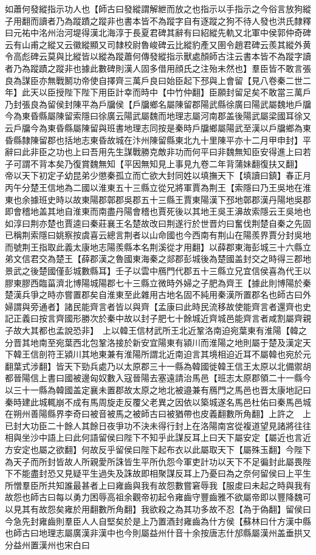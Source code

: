 如蕭何發縱指示功人也【師古曰發縱謂解紲而放之也指示以手指示之今俗言放狗縱子用翻而讀者乃為蹤蹟之蹤非也書本皆不為蹤字自有逐蹤之狗不待人發也洪氏隸釋曰元祐中洺州治河堤得漢北海淳于長夏君碑其辭有曰紹縱先軌又北軍中侯郭仲奇碑云有山甫之縱又云徽縱顯又司隸校尉魯峻碑云比縱豹產又圉令趙君碑云羨其縱外黄令高彪碑云莫與比縱皆以縱為蹤蕭何傳發縱指示獸處顏師古注云書本皆不為蹤字讀者乃為蹤蹟之蹤非也據此數碑則漢人固多借用顔氏之注殆未然也】羣臣皆不敢言張良為謀臣亦無戰鬭功帝使自擇齊三萬戶良曰始臣起下邳與上會留【見八卷秦二世二年】此天以臣授陛下陛下用臣計幸而時中【中竹仲翻】臣願封留足矣不敢當三萬戶乃封張良為留侯封陳平為戶牖侯【戶牖鄉名屬陳留郡陽武縣徐廣曰陽武屬魏地戶牖今為東昏縣屬陳留索隱曰徐廣云陽武屬魏而地理志屬河南郡盖後陽武屬梁國耳徐又云戶牖今為東昏縣屬陳留與班書地理志同按是秦時戶牖鄉屬陽武至漢以戶牖鄉為東昏縣隸陳留郡也括地志東昏故城在汴州陳留縣東北九十里陳平亦十二月甲申封】平辭曰此非臣之功也上曰吾用先生謀戰勝克敵非功而何平曰非魏無知臣安得進上曰若子可謂不背本矣乃復賞魏無知【平因無知見上事見九卷二年背蒲妹翻復扶又翻】　帝以天下初定子幼昆弟少懲秦孤立而亡欲大封同姓以填撫天下【填讀曰鎮】春正月丙午分楚王信地為二國以淮東五十三縣立從兄將軍賈為荆王【索隱曰乃王吳地在淮東也余據班史時以故東陽郡鄣郡吳郡五十三縣王賈東陽漢下邳地鄣郡漢丹陽地吳郡即會稽地盖其地自淮東而南盡丹陽會稽也賈死後以其地王吳王濞故索隱云王吳地也如淳曰荆亦楚也賈逵曰秦莊襄王名楚故改曰荆遂行於世晋灼曰奮伐荆楚自秦之先固已稱荆索隱曰姚察按虞喜云總言荆者以山命國也今西南有荆山在陽羨界賈分封吳地而號荆王指取此義太康地志陽羨縣本名荆溪從才用翻】以薛郡東海彭城三十六縣立弟文信君交為楚王【薛郡漢之魯國東海秦之郯郡彭城後為楚國盖封交之時得三郡地景武之後楚國僅彭城數縣耳】壬子以雲中鴈門代郡五十三縣立兄宜信侯喜為代王以膠東膠西臨菑濟北博陽城陽郡七十三縣立微時外婦之子肥為齊王【據此則博陽於秦楚漢兵爭之時亦嘗置郡矣自淮東至此雜用古地名固不純用秦漢所置郡名也師古曰外婦謂與旁通者】諸民能齊言者皆以與齊【孟康曰此時民流移故使能齊言者還齊也史記正義曰按言齊國形勝次於秦中故以封子肥七十餘城近齊城邑能齊言者咸割屬齊親子故大其都也孟說恐非】　上以韓王信材武所王北近鞏洛南迫宛葉東有淮陽【韓之分晋其地南至宛葉西北包鞏洛接於新安宜陽東有潁川而淮陽之地則屬于楚及漢定天下韓王信剖符王潁川其地東兼有淮陽所謂北近南迫言其境相迫近耳不屬韓也宛於元翻葉式涉翻】皆天下勁兵處乃以太原郡三十一縣為韓國徙韓王信王太原以北備禦胡都晉陽信上書曰國被邊匈奴數入寇晉陽去塞遠請治馬邑【班志太原郡領二十一縣今以三十一縣為韓國盖定襄未置郡故太原之地北被邉兼有鴈門之馬邑也晋太康地記曰秦時建此城輒崩不成有馬周旋走反覆父老異之因依以築城遂名馬邑杜佑曰秦馬邑城在朔州善陽縣界李奇曰被音被馬之被師古曰被猶帶也皮義翻數所角翻】上許之　上已封大功臣二十餘人其餘日夜爭功不決未得行封上在洛陽南宮從複道望見諸將往往相與坐沙中語上曰此何語留侯曰陛下不知乎此謀反耳上曰天下屬安定【屬近也言近方安定也屬之欲翻】何故反乎留侯曰陛下起布衣以此屬取天下【屬殊玉翻】今陛下為天子而所封皆故人所親愛所誅皆生平所仇怨今軍吏計功以天下不足徧封此屬畏陛下不能盡封恐又見疑平生過失及誅故即相聚謀反耳上乃憂曰為之奈何留侯曰上平生所憎羣臣所共知誰最甚者上曰雍齒與我有故怨數嘗窘辱我【服䖍曰未起之時與我有故怨也師古曰每以勇力困辱高祖余觀帝初起令雍齒守豐齒雅不欲屬帝即以豐降魏可以見其有故怨矣雍於用翻數所角翻】我欲殺之為其功多故不忍【為于偽翻】留侯曰今急先封雍齒則羣臣人人自堅矣於是上乃置酒封雍齒為什方侯【蘇林曰什方漢中縣也師古曰地理志屬廣漢非漢中也今則屬益州什音十余按唐志什邡縣屬漢州盖垂拱又分益州置漢州也宋白曰